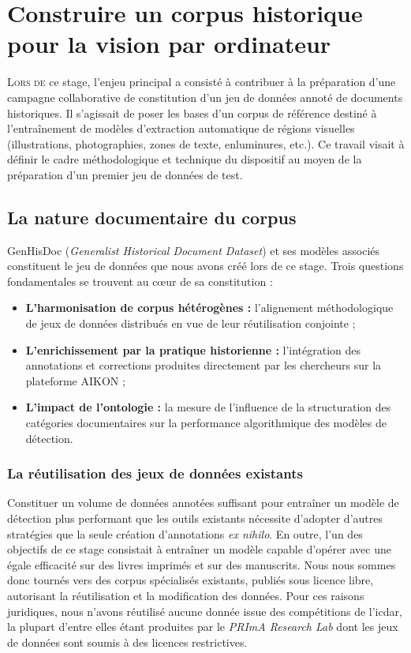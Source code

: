 \chapter[Construire un corpus historique]{Construire un corpus historique pour la vision par ordinateur}

\lettrine{L}{ors de} ce stage, l'enjeu principal a consisté à contribuer à la préparation d'une campagne collaborative de constitution d'un jeu de données annoté de documents historiques. Il s'agissait de poser les bases d'un corpus de référence destiné à l'entraînement de modèles d'extraction automatique de régions visuelles (illustrations, photographies, zones de texte, enluminures, etc.). Ce travail visait à définir le cadre méthodologique et technique du dispositif au moyen de la préparation d'un premier jeu de données de test.

\section{La nature documentaire du corpus}

GenHisDoc (\textit{Generalist Historical Document Dataset}) et ses modèles associés constituent le jeu de données que nous avons créé lors de ce stage. Trois questions fondamentales se trouvent au cœur de sa constitution :

\begin{itemize}
	\item \textbf{L'harmonisation de corpus hétérogènes :} l'alignement méthodologique de jeux de données distribués en vue de leur réutilisation conjointe ;
	\item \textbf{L'enrichissement par la pratique historienne :} l'intégration des annotations et corrections produites directement par les chercheurs sur la plateforme AIKON ;
	\item \textbf{L'impact de l'ontologie :} la mesure de l'influence de la structuration des catégories documentaires sur la performance algorithmique des modèles de détection.
\end{itemize}


\subsection{La réutilisation des jeux de données existants}

Constituer un volume de données annotées suffisant pour entraîner un modèle de détection plus performant que les outils existants nécessite d'adopter d'autres stratégies que la seule création d'annotations \textit{ex nihilo}. En outre, l'un des objectifs de ce stage consistait à entraîner un modèle capable d'opérer avec une égale efficacité sur des livres imprimés et sur des manuscrits. Nous nous sommes donc tournés vers des corpus spécialisés existants, publiés sous licence libre, autorisant la réutilisation et la modification des données. Pour ces raisons juridiques, nous n'avons réutilisé aucune donnée issue des compétitions de l'\gls{icdar}, la plupart d'entre elles étant produites par le \textit{PRImA Research Lab} dont les jeux de données sont soumis à des licences restrictives.

